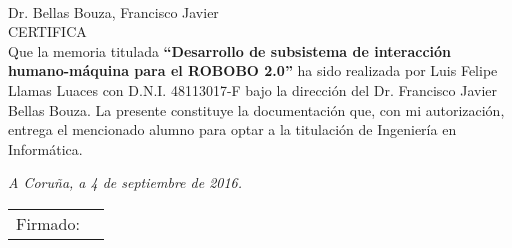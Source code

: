 \thispagestyle{empty}
\mbox{}\\[4cm]
\noindent Dr. Bellas Bouza, Francisco Javier \\[1cm]
\textsc{CERTIFICA}\\[1.5cm]
\indent Que la memoria titulada \textbf{``Desarrollo de subsistema de interacción humano-máquina para el ROBOBO 2.0''}
ha sido realizada por Luis Felipe Llamas Luaces con D.N.I. 48113017-F bajo la
dirección del Dr. Francisco Javier Bellas Bouza. La presente constituye la
documentación que, con mi autorización, entrega el mencionado
alumno para optar a la titulación de Ingeniería en Informática.
\vfill
\begin{flushright}
\emph{A Coruña, a 4 de septiembre de 2016.} \\[2cm]
\begin{tabular}{ll}
Firmado: & \\
\end{tabular}
\end{flushright}